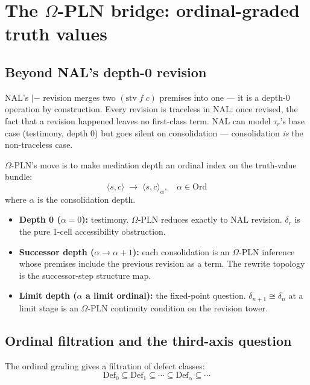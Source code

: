 \documentclass[11pt]{article}
\newcommand{\taur}{\tau_r}
\begin{document}
\section{The $\Omega$-PLN bridge: ordinal-graded truth values}

\subsection{Beyond NAL's depth-0 revision}

NAL's $|-$ revision merges two $(\mathrm{stv}\; f\; c)$ premises into one --- it is a depth-0
operation by construction. Every revision is traceless in NAL: once revised, the fact that a
revision happened leaves no first-class term. NAL can model $\taur$'s base case (testimony,
depth 0) but goes silent on consolidation --- consolidation \emph{is} the non-traceless case.

$\Omega$-PLN's move is to make mediation depth an ordinal index on the truth-value bundle:
$$
  \langle s, c\rangle \;\longrightarrow\; \langle s, c\rangle_\alpha, \quad \alpha \in \mathrm{Ord}
$$
where $\alpha$ is the consolidation depth.

\begin{itemize}
  \item \textbf{Depth 0 ($\alpha = 0$):} testimony. $\Omega$-PLN reduces exactly to NAL revision.
  $\delta_r$ is the pure 1-cell accessibility obstruction.

  \item \textbf{Successor depth ($\alpha \to \alpha+1$):} each consolidation is an $\Omega$-PLN
  inference whose premises include the previous revision as a term. The rewrite topology is
  the successor-step structure map.

  \item \textbf{Limit depth ($\alpha$ a limit ordinal):} the fixed-point question.
  $\delta_{n+1} \cong \delta_n$ at a limit stage is an $\Omega$-PLN continuity condition on
  the revision tower.
\end{itemize}

\subsection{Ordinal filtration and the third-axis question}

The ordinal grading gives a filtration of defect classes:
$$
  \mathrm{Def}_0 \subseteq \mathrm{Def}_1 \subseteq \cdots \subseteq \mathrm{Def}_\alpha
  \subseteq \cdots
$$
\end{document}
